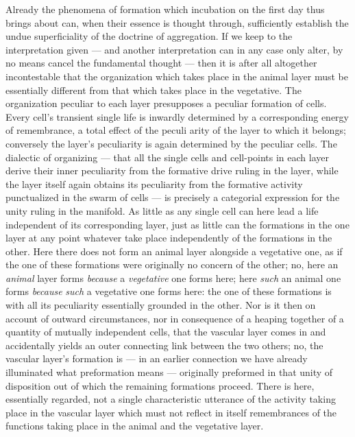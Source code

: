 \documentclass[12pt,a4paper]{book}
\begin{document}
Already the phenomena of formation which incubation on the first day thus brings
about can, when their essence is thought through, sufficiently establish the undue
superficiality of the doctrine of aggregation. If we keep to the interpretation
given --- and another interpretation can in any case only alter, by no means cancel
the fundamental thought --- then it is after all altogether incontestable that the
organization which takes place in the animal layer must be essentially different
from that which takes place in the vegetative. The organization peculiar to each
layer presupposes a peculiar formation of cells. Every cell's transient single life
is inwardly determined by a corresponding energy of remembrance, a total effect of
the peculi%
arity of the layer to which it belongs; conversely the layer's peculiarity is again
determined by the peculiar cells. The dialectic of organizing --- that all the
single cells and cell-points in each layer derive their inner peculiarity from the
formative drive ruling in the layer, while the layer itself again obtains its
peculiarity from the formative activity punctualized in the swarm of cells --- is
precisely a categorial expression for the unity ruling in the manifold. As little
as any single cell can here lead a life independent of its corresponding layer,
just as little can the formations in the one layer at any point whatever take place
independently of the formations in the other. Here there does not form an animal
layer alongside a vegetative one, as if the one of these formations were originally
no concern of the other; no, here an \emph{animal} layer forms \emph{because} a
\emph{vegetative} one forms here; here \emph{such} an animal one forms
\emph{because} \emph{such} a vegetative one forms here: the one of these formations
is with all its peculiarity essentially grounded in the other. Nor is it then on
account of outward circumstances, nor in consequence of a heaping together of a
quantity of mutually independent cells, that the vascular layer comes in and
accidentally yields an outer connecting link between the two others; no, the
vascular layer's formation is --- in an earlier connection we have already
illuminated what preformation means --- originally preformed in that unity of
disposition out of which the remaining formations proceed. There is here,
essentially regarded, not a single characteristic utterance of the activity taking
place in the vascular layer which must not reflect in itself remembrances of the
functions taking place in the animal and the vegetative layer.
\end{document}
